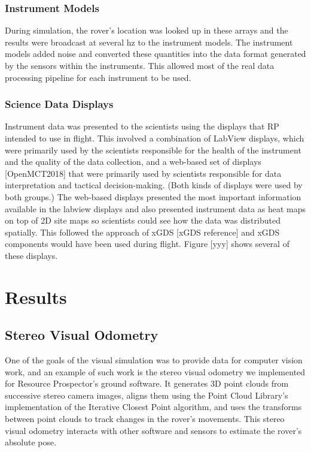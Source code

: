 \documentclass[twocolumn,letterpaper]{IEEEAerospaceCLS}  %
\begin{document}
\subsubsection{Instrument Models}
During simulation, the rover's location was looked up in these arrays and the results were broadcast at several hz to the instrument models.  The instrument models added noise and converted these quantities into the data format generated by the sensors within the instruments.  This allowed most of the real data processing pipeline for each instrument to be used.

\subsubsection{Science Data Displays}
Instrument data was presented to the scientists using the displays that RP intended to use in flight.  This involved a combination of LabView displays, which were primarily used by the scientists responsible for the health of the instrument and the quality of the data collection, and a web-based set of displays [OpenMCT2018] that were primarily used by scientists responsible for data interpretation and tactical decision-making.  (Both kinds of displays were used by both groups.)  The web-based displays presented the most important information available in the labview displays and also presented instrument data as heat maps on top of 2D site maps so scientists could see how the data was distributed spatially.  This followed the approach of xGDS [xGDS reference] and xGDS components would have been used during flight.  Figure [yyy] shows several of these displays.

\section{Results}

\subsection{Stereo Visual Odometry}
One of the goals of the visual simulation was to provide data for computer vision work, and an example of such work is the stereo visual odometry we implemented for Resource Prospector's ground software.
It generates 3D point clouds from successive stereo camera images, aligns them using the Point Cloud Library's implementation of the Iterative Closest Point algorithm, and uses the transforms between point clouds to track changes in the rover's movements.
This stereo visual odometry interacts with other software and sensors to estimate the rover's absolute pose.
\end{document}
